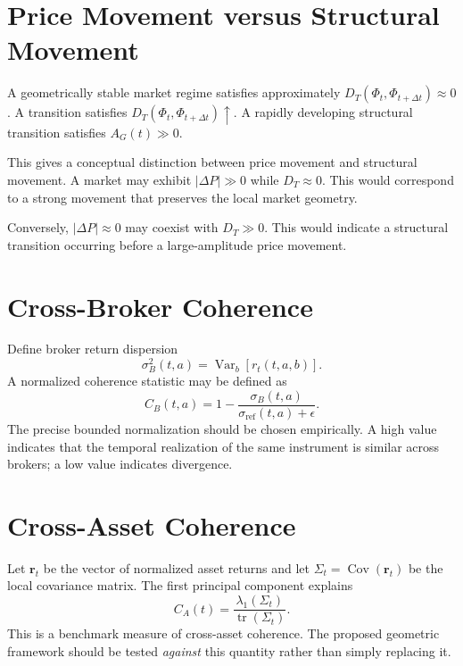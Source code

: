 \documentclass[11pt,a4paper]{article}
\numberwithin{equation}{section}
\newcommand{\Var}{\operatorname{Var}}
\newcommand{\Cov}{\operatorname{Cov}}
\newcommand{\tr}{\operatorname{tr}}
\newcommand{\abs}[1]{\left|#1\right|}
\begin{document}
\section{Price Movement versus Structural Movement}

A geometrically stable market regime satisfies approximately
$D_T(\Phi_t,\Phi_{t+\Delta t})\approx0$. A transition satisfies
$D_T(\Phi_t,\Phi_{t+\Delta t})\uparrow$. A rapidly developing
structural transition satisfies $A_G(t)\gg0$.

This gives a conceptual distinction between price movement and
structural movement. A market may exhibit $\abs{\Delta P}\gg0$ while
$D_T\approx0$. This would correspond to a strong movement that
preserves the local market geometry.

Conversely, $\abs{\Delta P}\approx0$ may coexist with $D_T\gg0$.
This would indicate a structural transition occurring before a
large-amplitude price movement.

\section{Cross-Broker Coherence}

Define broker return dispersion
\begin{equation}
\sigma_B^2(t,a)=\Var_b\left[r_t(t,a,b)\right].
\end{equation}
A normalized coherence statistic may be defined as
\begin{equation}
C_B(t,a)=1-\frac{\sigma_B(t,a)}{\sigma_{\mathrm{ref}}(t,a)+\epsilon}.
\label{eq:CB}
\end{equation}
The precise bounded normalization should be chosen empirically. A
high value indicates that the temporal realization of the same
instrument is similar across brokers; a low value indicates
divergence.

\section{Cross-Asset Coherence}

Let $\bm{r}_t$ be the vector of normalized asset returns and let
$\Sigma_t=\Cov(\bm{r}_t)$ be the local covariance matrix. The first
principal component explains
\begin{equation}
C_A(t)=\frac{\lambda_1(\Sigma_t)}{\tr(\Sigma_t)}.
\label{eq:CA}
\end{equation}
This is a benchmark measure of cross-asset coherence. The proposed
geometric framework should be tested \emph{against} this quantity
rather than simply replacing it.
\end{document}
